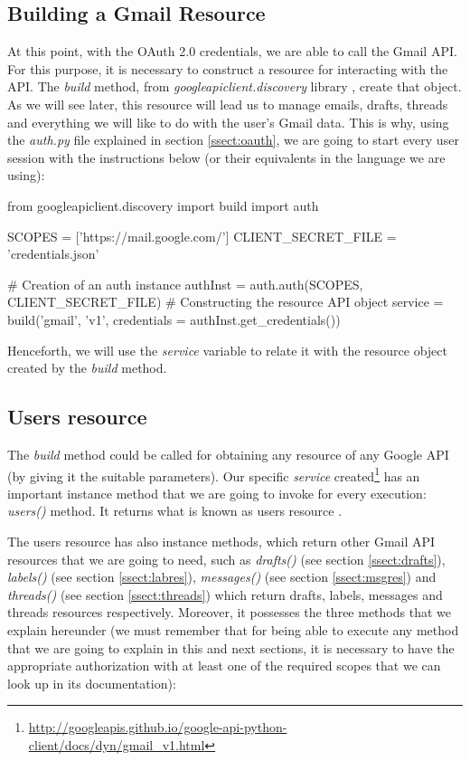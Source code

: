 \subsection{Building a Gmail Resource} \label{ssect:gmailres}
At this point, with the OAuth 2.0 credentials, we are able to call the Gmail API. For this purpose, it is necessary to construct a resource \citep[/v1/reference]{gmailAPI} for interacting with the API. The \textit{build} method, from \textit{googleapiclient.discovery} library \citep{build-module}, create that object. As we will see later, this resource will lead us to manage emails, drafts, threads and everything we will like to do with the user's Gmail data. This is why, using the \textit{auth.py} file explained in section \ref{ssect:oauth}, we are going to start every user session with the instructions below (or their equivalents in the language we are using):

\begin{python}
from googleapiclient.discovery import build
import auth

SCOPES = ['https://mail.google.com/']
CLIENT_SECRET_FILE = 'credentials.json'

# Creation of an auth instance
authInst = auth.auth(SCOPES, CLIENT_SECRET_FILE)
# Constructing the resource API object
service = build('gmail', 'v1', credentials = authInst.get_credentials())
\end{python}

Henceforth, we will use the \textit{service} variable to relate it with the resource object created by the \textit{build} method.

\subsection{Users resource}\label{ssect:userres}
The \textit{build} method could be called for obtaining any resource of any Google API (by giving it the suitable parameters). Our specific \textit{service} created\footnote{\url{http://googleapis.github.io/google-api-python-client/docs/dyn/gmail\_v1.html}} has an important instance method that we are going to invoke for every execution: \textit{users()} method. It returns what is known as users resource \citep[/v1/reference/users]{gmailAPI}.

The users resource has also instance methods, which return other Gmail API resources that we are going to need, such as \textit{drafts()} (see section \ref{ssect:drafts}), \textit{labels()} (see section \ref{ssect:labres}), \textit{messages()} (see section \ref{ssect:msgres}) and \textit{threads()} (see section \ref{ssect:threads}) which return drafts, labels, messages and threads resources respectively. Moreover, it possesses the three methods that we explain hereunder (we must remember that for being able to execute any method that we are going to explain in this and next sections, it is necessary to have the appropriate authorization with at least one of the required scopes that we can look up in its documentation):


